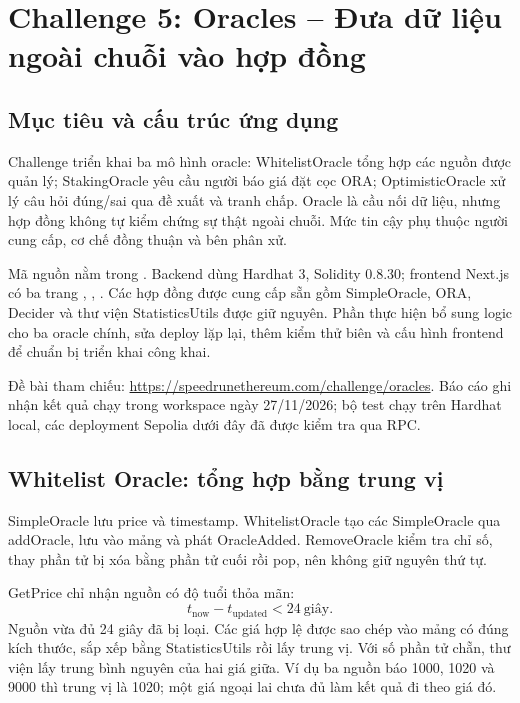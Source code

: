 \section{Challenge 5: Oracles -- Đưa dữ liệu ngoài chuỗi vào hợp đồng}
\label{sec:challenge5-oracles}

\subsection{Mục tiêu và cấu trúc ứng dụng}

Challenge triển khai ba mô hình oracle: WhitelistOracle tổng hợp các nguồn được quản lý; StakingOracle yêu cầu người báo giá đặt cọc ORA; OptimisticOracle xử lý câu hỏi đúng/sai qua đề xuất và tranh chấp. Oracle là cầu nối dữ liệu, nhưng hợp đồng không tự kiểm chứng sự thật ngoài chuỗi. Mức tin cậy phụ thuộc người cung cấp, cơ chế đồng thuận và bên phân xử.

Mã nguồn nằm trong . Backend dùng Hardhat 3, Solidity 0.8.30; frontend Next.js có ba trang , , . Các hợp đồng được cung cấp sẵn gồm SimpleOracle, ORA, Decider và thư viện StatisticsUtils được giữ nguyên. Phần thực hiện bổ sung logic cho ba oracle chính, sửa deploy lặp lại, thêm kiểm thử biên và cấu hình frontend để chuẩn bị triển khai công khai.

Đề bài tham chiếu: \url{https://speedrunethereum.com/challenge/oracles}. Báo cáo ghi nhận kết quả chạy trong workspace ngày 27/11/2026; bộ test chạy trên Hardhat local, các deployment Sepolia dưới đây đã được kiểm tra qua RPC.

\subsection{Whitelist Oracle: tổng hợp bằng trung vị}

SimpleOracle lưu price và timestamp. WhitelistOracle tạo các SimpleOracle qua addOracle, lưu vào mảng và phát OracleAdded. RemoveOracle kiểm tra chỉ số, thay phần tử bị xóa bằng phần tử cuối rồi pop, nên không giữ nguyên thứ tự.

GetPrice chỉ nhận nguồn có độ tuổi thỏa mãn:
\[
    t_{\mathrm{now}}-t_{\mathrm{updated}}<24\ \mathrm{giây}.
\]
Nguồn vừa đủ 24 giây đã bị loại. Các giá hợp lệ được sao chép vào mảng có đúng kích thước, sắp xếp bằng StatisticsUtils rồi lấy trung vị. Với số phần tử chẵn, thư viện lấy trung bình nguyên của hai giá giữa. Ví dụ ba nguồn báo 1000, 1020 và 9000 thì trung vị là 1020; một giá ngoại lai chưa đủ làm kết quả đi theo giá đó.

